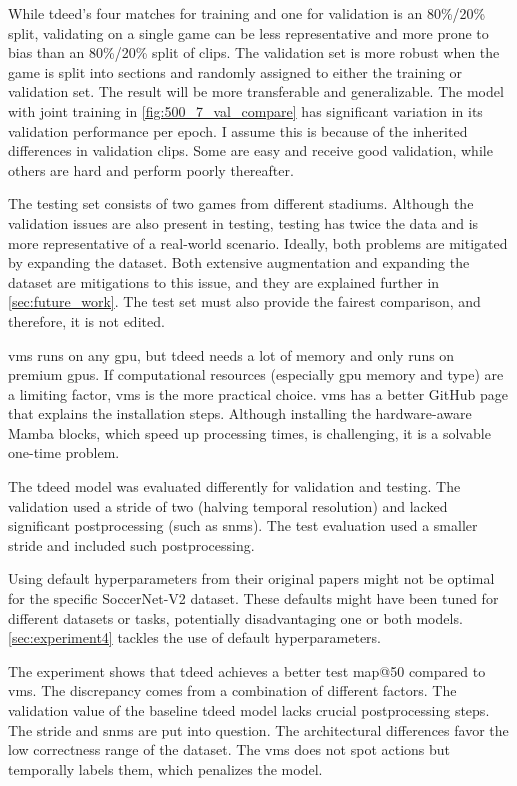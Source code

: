 While \acrshort{tdeed}'s four matches for training and one for validation is an 80\%/20\% split, validating on a single game can be less representative and more prone to bias than an 80\%/20\% split of clips. The validation set is more robust when the game is split into sections and randomly assigned to either the training or validation set. The result will be more transferable and generalizable. The model with joint training in \cref{fig:500_7_val_compare} has significant variation in its validation performance per epoch. I assume this is because of the inherited differences in validation clips. Some are easy and receive good validation, while others are hard and perform poorly thereafter. 

The testing set consists of two games from different stadiums. Although the validation issues are also present in testing, testing has twice the data and is more representative of a real-world scenario. Ideally, both problems are mitigated by expanding the dataset. Both extensive augmentation and expanding the dataset are mitigations to this issue, and they are explained further in \cref{sec:future_work}. The test set must also provide the fairest comparison, and therefore, it is not edited. 

\acrshort{vms} runs on any \acrshort{gpu}, but \acrshort{tdeed} needs a lot of memory and only runs on premium \acrshort{gpu}s. If computational resources (especially \acrshort{gpu} memory and type) are a limiting factor, \acrshort{vms} is the more practical choice. \acrshort{vms} has a better GitHub page that explains the installation steps. Although installing the hardware-aware Mamba blocks, which speed up processing times, is challenging, it is a solvable one-time problem.


The \acrshort{tdeed} model was evaluated differently for validation and testing. The validation used a stride of two (halving temporal resolution) and lacked significant postprocessing (such as \acrshort{snms}). The test evaluation used a smaller stride and included such postprocessing. 


Using default hyperparameters from their original papers might not be optimal for the specific SoccerNet-V2 dataset. These defaults might have been tuned for different datasets or tasks, potentially disadvantaging one or both models. \cref{sec:experiment4} tackles the use of default hyperparameters.


The experiment shows that \acrshort{tdeed} achieves a better test \acrshort{map}@50 compared to \acrshort{vms}. The discrepancy comes from a combination of different factors. The validation value of the baseline \acrshort{tdeed} model lacks crucial postprocessing steps. The stride and \acrfull{snms} are put into question. The architectural differences favor the low correctness range of the dataset. The \acrshort{vms} does not spot actions but temporally labels them, which penalizes the model. 


